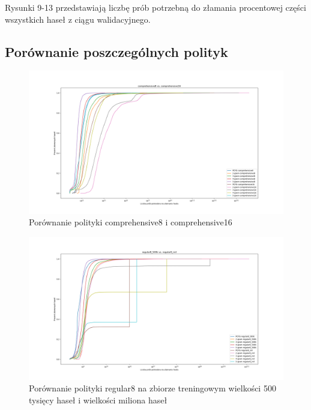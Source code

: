 \documentclass{article}
\begin{document}
	Rysunki 9-13 przedstawiają liczbę prób potrzebną do złamania procentowej części wszystkich haseł z ciągu walidacyjnego.

	\subsection{Porównanie poszczególnych polityk}
	\begin{figure}[H]
		\centering
		\includegraphics[width=15cm, keepaspectratio]{comprehensive8_comprehensive16}
		\caption{Porównanie polityki comprehensive8 i comprehensive16}
	\end{figure}

	\begin{figure}[H]
		\centering
		\includegraphics[width=15cm, keepaspectratio]{regular8_500k_regular8_mil}
		\caption{Porównanie polityki regular8 na zbiorze treningowym wielkości 500 tysięcy haseł i wielkości miliona haseł}
	\end{figure}
\end{document}
